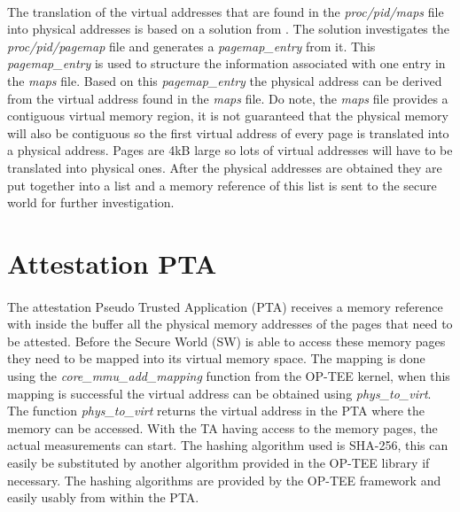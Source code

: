 \paragraph*{}%
The translation of the virtual addresses that are found in the \textit{proc/pid/maps} file into physical addresses is based on a solution from \cite{cirosantilli}. The solution investigates the \textit{proc/pid/pagemap} file and generates a \textit{pagemap\_entry} from it. This \textit{pagemap\_entry} is used to structure the information associated with one entry in the \textit{maps} file. Based on this \textit{pagemap\_entry} the physical address can be derived from the virtual address found in the \textit{maps} file. Do note, the \textit{maps} file provides a contiguous virtual memory region, it is not guaranteed that the physical memory will also be contiguous so the first virtual address of every page is translated into a physical address. Pages are 4kB large so lots of virtual addresses will have to be translated into physical ones. After the physical addresses are obtained they are put together into a list and a memory reference of this list is sent to the secure world for further investigation.

\section{Attestation PTA}

\paragraph*{}%
The attestation Pseudo Trusted Application (PTA) receives a memory reference with inside the buffer all the physical memory addresses of the pages that need to be attested. Before the Secure World (SW) is able to access these memory pages they need to be mapped into its virtual memory space. The mapping is done using the \textit{core\_mmu\_add\_mapping} function from the OP-TEE kernel, when this mapping is successful the virtual address can be obtained using \textit{phys\_to\_virt}. The function \textit{phys\_to\_virt} returns the virtual address in the PTA where the memory can be accessed. With the TA having access to the memory pages, the actual measurements can start. The hashing algorithm used is SHA-256, this can easily be substituted by another algorithm provided in the OP-TEE library if necessary. The hashing algorithms are provided by the OP-TEE framework and easily usably from within the PTA.

